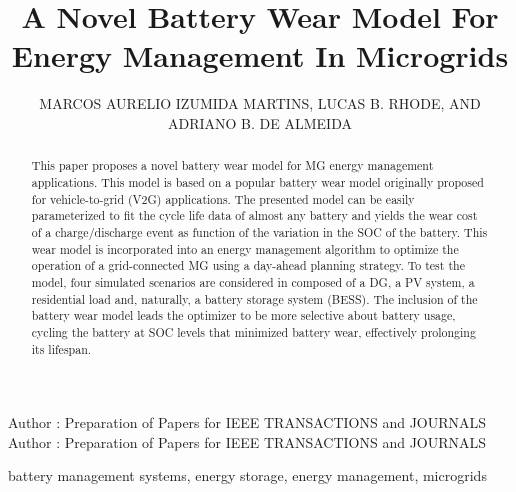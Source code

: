 \documentclass{ieeeaccess}
\begin{document}
    


    \title{A Novel Battery Wear Model For Energy Management In Microgrids}

    \author{
    	\uppercase{Marcos Aurelio Izumida Martins}, 
    	\uppercase{Lucas B. Rhode},
    	\uppercase{and Adriano B. de Almeida}
    }

    \address[1]{Sustainable Energies Center, CERTI Foundation, Brazil (e-mail: mlz@certi.org.br)}
    \address[2]{Underwriters Laboratories, Brazil (e-mail: lucas.rhode@ul.com)}
    \address[3]{Western Parana State University, Brazil (e-mail: adriano.almeida@unioeste.br)}

    \markboth
    {Author \headeretal: Preparation of Papers for IEEE TRANSACTIONS and JOURNALS}
    {Author \headeretal: Preparation of Papers for IEEE TRANSACTIONS and JOURNALS}


    \begin{abstract}
        This paper proposes a novel battery wear model for \ac{MG} energy management applications. This model is based on a popular battery wear model originally proposed for vehicle-to-grid (V2G) applications. The presented model can be easily parameterized to fit the cycle life data of almost any battery and yields the wear cost of a charge/discharge event as function of the variation in the \ac{SOC} of the battery. This wear model is incorporated into an energy management algorithm to optimize the operation of a grid-connected \ac{MG} using a day-ahead planning strategy. To test the model, four simulated scenarios are considered in  composed of a \ac{DG}, a \ac{PV} system, a residential load and, naturally, a battery storage system (\ac{BESS}). The inclusion of the battery wear model leads the optimizer to be more selective about battery usage, cycling the battery at \ac{SOC} levels that minimized battery wear, effectively prolonging its lifespan.
    \end{abstract}

    \begin{keywords}
        battery management systems, energy storage, energy management, microgrids
    \end{keywords}
\end{document}
